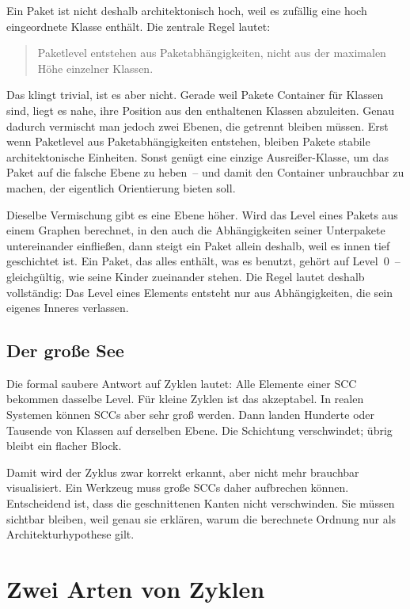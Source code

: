 \documentclass[a4paper,11pt]{article}
\begin{document}
Ein Paket ist nicht deshalb architektonisch hoch, weil es zuf\"allig eine hoch
eingeordnete Klasse enth\"alt. Die zentrale Regel lautet:

\begin{quote}
  Paketlevel entstehen aus Paketabh\"angigkeiten, nicht aus der maximalen
  H\"ohe einzelner Klassen.
\end{quote}

Das klingt trivial, ist es aber nicht. Gerade weil Pakete Container f\"ur
Klassen sind, liegt es nahe, ihre Position aus den enthaltenen Klassen
abzuleiten. Genau dadurch vermischt man jedoch zwei Ebenen, die getrennt
bleiben m\"ussen. Erst wenn Paketlevel aus Paketabh\"angigkeiten entstehen,
bleiben Pakete stabile architektonische Einheiten. Sonst gen\"ugt eine einzige
Ausrei\ss{}er-Klasse, um das Paket auf die falsche Ebene zu heben~-- und damit
den Container unbrauchbar zu machen, der eigentlich Orientierung bieten soll.

Dieselbe Vermischung gibt es eine Ebene h\"oher. Wird das Level eines
Pakets aus einem Graphen berechnet, in den auch die Abh\"angigkeiten seiner
Unterpakete untereinander einflie\ss{}en, dann steigt ein Paket allein deshalb,
weil es innen tief geschichtet ist. Ein Paket, das alles enth\"alt, was es
benutzt, geh\"ort auf Level~0~-- gleichg\"ultig, wie seine Kinder zueinander
stehen. Die Regel lautet deshalb vollst\"andig: Das Level eines Elements
entsteht nur aus Abh\"angigkeiten, die sein eigenes Inneres verlassen.

\subsection{Der gro\ss{}e See}

Die formal saubere Antwort auf Zyklen lautet: Alle Elemente einer SCC bekommen
dasselbe Level. F\"ur kleine Zyklen ist das akzeptabel. In realen Systemen
k\"onnen SCCs aber sehr gro\ss{} werden. Dann landen Hunderte oder Tausende von
Klassen auf derselben Ebene. Die Schichtung verschwindet; \"ubrig bleibt ein
flacher Block.

Damit wird der Zyklus zwar korrekt erkannt, aber nicht mehr brauchbar
visualisiert. Ein Werkzeug muss gro\ss{}e SCCs daher aufbrechen k\"onnen.
Entscheidend ist, dass die geschnittenen Kanten nicht verschwinden. Sie m\"ussen
sichtbar bleiben, weil genau sie erkl\"aren, warum die berechnete Ordnung nur
als Architekturhypothese gilt.

\section{Zwei Arten von Zyklen}
\end{document}
